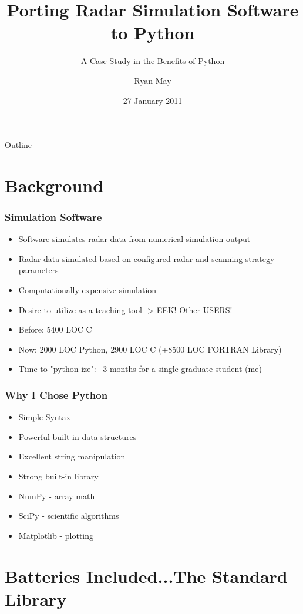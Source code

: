 \documentclass[red, hyperref={pdfpagelabels=false}]{beamer}
\title[Porting Radar Simulation Software DRAFT (\today)]
{Porting Radar Simulation Software to Python}
\subtitle{A Case Study in the Benefits of Python}
\author{Ryan May}
\institute{Enterprise Electronics Corporation}
\date{27 January 2011}
\begin{document}
\frame{\titlepage}

\section[Outline]{}
\begin{frame}{Outline}
    \tableofcontents
\end{frame}

\section{Background}
\begin{frame}
  \frametitle{Simulation Software}
  \begin{itemize}
    \item Software simulates radar data from numerical simulation output
    \item Radar data simulated based on configured radar and scanning strategy parameters
    \item Computationally expensive simulation
    \item Desire to utilize as a teaching tool -> EEK! Other USERS!
    \item Before: 5400 LOC C
    \item Now: 2000 LOC Python, 2900 LOC C (+8500 LOC FORTRAN Library)
    \item Time to "python-ize": ~3 months for a single graduate student (me)
  \end{itemize}
\end{frame}

\begin{frame}
  \frametitle{Why I Chose Python}
  \begin{itemize}
    \item Simple Syntax
    \item Powerful built-in data structures
    \item Excellent string manipulation
    \item Strong built-in library
    \item NumPy - array math
    \item SciPy - scientific algorithms
    \item Matplotlib - plotting
  \end{itemize}
\end{frame}

\section{Batteries Included...The Standard Library}
\end{document}
